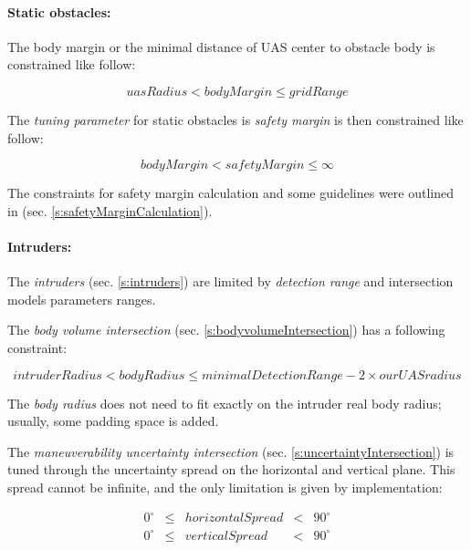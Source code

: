 \paragraph{Static obstacles:} The body margin or the minimal distance of UAS center to obstacle body is constrained like follow:

\begin{equation*}
    uas Radius < body Margin \le grid Range
\end{equation*}

The \emph{tuning parameter} for static obstacles is \emph{safety margin} is then constrained like follow:

\begin{equation*}
    body Margin < safety Margin \le \infty
\end{equation*}


The constraints for safety margin calculation and some guidelines were outlined in (sec. \ref{s:safetyMarginCalculation}).

\paragraph{Intruders:} The \emph{intruders} (sec. \ref{s:intruders}) are limited by \emph{detection range} and intersection models parameters ranges. 

The \emph{body volume intersection} (sec. \ref{s:bodyvolumeIntersection}) has a following constraint:

\begin{equation*}
    intruder Radius < body Radius \le minimal Detection Range - 2 \times our UAS radius
\end{equation*}

\begin{note}
    The \emph{body radius} does not need to fit exactly on the intruder real body radius; usually, some padding space is added.
\end{note}

The \emph{maneuverability uncertainty intersection} (sec. \ref{s:uncertaintyIntersection}) is tuned through the uncertainty spread on the horizontal and vertical plane. This spread cannot be infinite, and the only limitation is given by implementation:

\begin{equation*}
    \begin{aligned}
        0^\circ & \le&  horizontal Spread &< &90^\circ\\
        0^\circ & \le&  vertical Spread &< &90^\circ
    \end{aligned}
\end{equation*}



